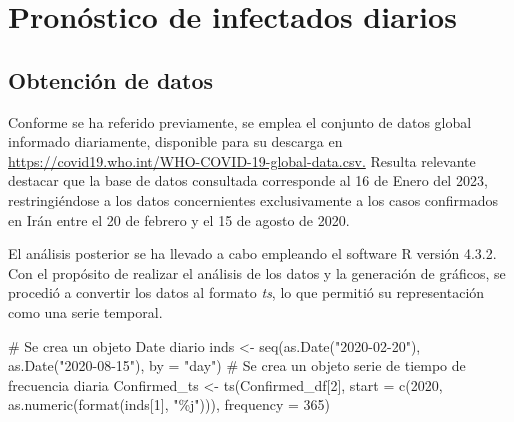 \documentclass[
  us-letterpaper,
]{scrreprt}
\newenvironment{Shaded}{\begin{snugshade}}{\end{snugshade}}
\newcommand{\AttributeTok}[1]{\textcolor[rgb]{0.40,0.45,0.13}{#1}}
\newcommand{\CommentTok}[1]{\textcolor[rgb]{0.37,0.37,0.37}{#1}}
\newcommand{\DecValTok}[1]{\textcolor[rgb]{0.68,0.00,0.00}{#1}}
\newcommand{\FunctionTok}[1]{\textcolor[rgb]{0.28,0.35,0.67}{#1}}
\newcommand{\NormalTok}[1]{\textcolor[rgb]{0.00,0.23,0.31}{#1}}
\newcommand{\OtherTok}[1]{\textcolor[rgb]{0.00,0.23,0.31}{#1}}
\newcommand{\StringTok}[1]{\textcolor[rgb]{0.13,0.47,0.30}{#1}}
\theoremstyle{plain}
\theoremstyle{definition}
\theoremstyle{definition}
\theoremstyle{plain}
\theoremstyle{remark}
\begin{document}
\chapter{Pronóstico de infectados
diarios}\label{pronuxf3stico-de-infectados-diarios}

\section{Obtención de datos}\label{obtenciuxf3n-de-datos}

Conforme se ha referido previamente, se emplea el conjunto de datos
global informado diariamente, disponible para su descarga en
\url{https://covid19.who.int/WHO-COVID-19-global-data.csv.} Resulta
relevante destacar que la base de datos consultada corresponde al 16 de
Enero del 2023, restringiéndose a los datos concernientes exclusivamente
a los casos confirmados en Irán entre el 20 de febrero y el 15 de agosto
de 2020.

El análisis posterior se ha llevado a cabo empleando el software R
versión 4.3.2. Con el propósito de realizar el análisis de los datos y
la generación de gráficos, se procedió a convertir los datos al formato
\emph{ts}, lo que permitió su representación como una serie temporal.

\begin{Shaded}
\begin{Highlighting}[]
\CommentTok{\# Se crea un objeto \textquotesingle{}Date\textquotesingle{} diario}
\NormalTok{inds }\OtherTok{\textless{}{-}} \FunctionTok{seq}\NormalTok{(}\FunctionTok{as.Date}\NormalTok{(}\StringTok{"2020{-}02{-}20"}\NormalTok{), }\FunctionTok{as.Date}\NormalTok{(}\StringTok{"2020{-}08{-}15"}\NormalTok{), }\AttributeTok{by =} \StringTok{"day"}\NormalTok{)}
\CommentTok{\# Se crea un objeto \textquotesingle{}serie de tiempo\textquotesingle{} de frecuencia diaria}
\NormalTok{Confirmed\_ts }\OtherTok{\textless{}{-}} \FunctionTok{ts}\NormalTok{(Confirmed\_df[}\DecValTok{2}\NormalTok{], }
                   \AttributeTok{start =} \FunctionTok{c}\NormalTok{(}\DecValTok{2020}\NormalTok{, }\FunctionTok{as.numeric}\NormalTok{(}\FunctionTok{format}\NormalTok{(inds[}\DecValTok{1}\NormalTok{], }\StringTok{"\%j"}\NormalTok{))),}
                   \AttributeTok{frequency =} \DecValTok{365}\NormalTok{)}
\end{Highlighting}
\end{Shaded}
\end{document}
